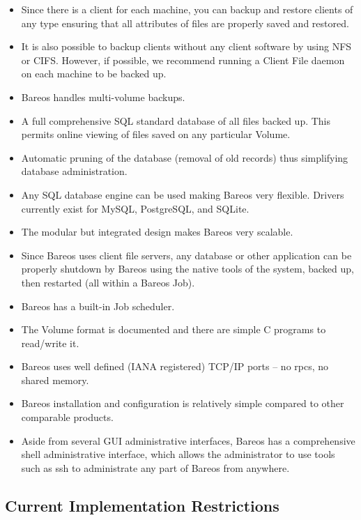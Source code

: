 \begin{itemize}
\item Since there is a client for each machine, you can backup
   and restore clients of any type ensuring that all attributes
   of files are properly saved and restored.
\item It is also possible to backup clients without any client
   software by using NFS or CIFS.  However, if possible, we
   recommend running a Client File daemon on each machine to be
   backed up.
\item Bareos handles multi-volume backups.
\item A full comprehensive SQL standard database of all files backed up.  This
   permits online viewing of files saved on any particular  Volume.
\item Automatic pruning of the database (removal of old records) thus
   simplifying database administration.
\item Any SQL database engine can be used making Bareos very flexible.
      Drivers currently exist for MySQL, PostgreSQL, and SQLite.
\item The modular but integrated design makes Bareos very scalable.
\item Since Bareos uses client file servers, any database or
   other application can be properly shutdown by Bareos using the
   native tools of the system, backed up, then restarted (all
   within a Bareos Job).
\item Bareos has a built-in Job scheduler.
\item The Volume format is documented and there are simple C programs to
   read/write it.
\item Bareos uses well defined (IANA registered) TCP/IP ports -- no rpcs,  no
   shared memory.
\item Bareos installation and configuration is relatively simple compared  to
   other comparable products.
\item Aside from several GUI administrative interfaces, Bareos has a
   comprehensive shell administrative interface, which allows the
   administrator to use tools such as ssh to administrate any part of
   Bareos from anywhere.
\end{itemize}

\subsection{Current Implementation Restrictions}

